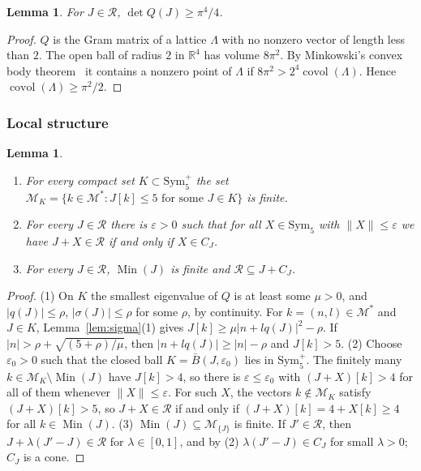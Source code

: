 \documentclass[11pt,reqno]{amsart}
\renewcommand{\_}{\origunderscore\allowbreak}
\numberwithin{equation}{section}
\theoremstyle{plain}
\newtheorem{lem}[thm]{Lemma}
\theoremstyle{definition}
\theoremstyle{remark}
\newcommand{\R}{\mathbb{R}}
\newcommand{\M}{\mathcal{M}}
\newcommand{\Rk}{\mathcal{R}}
\newcommand{\Sym}{\mathrm{Sym}}
\newcommand{\Min}{\operatorname{Min}}
\newcommand{\covol}{\operatorname{covol}}
\begin{document}
\begin{lem}\label{lem:minkowski}
For $J\in\Rk$, $\det Q(J)\ge\pi^4/4$.
\end{lem}

\begin{proof}
$Q$ is the Gram matrix of a lattice $\Lambda$ with no nonzero vector of length less than $2$. The open ball of radius $2$ in $\R^4$ has volume $8\pi^2$. By Minkowski's convex body theorem~\cite[Ch.~III]{Cassels1959} it contains a nonzero point of $\Lambda$ if $8\pi^2>2^4\covol(\Lambda)$. Hence $\covol(\Lambda)\ge\pi^2/2$.
\end{proof}

\subsubsection{Local structure}

\begin{lem}\label{lem:local}
\begin{enumerate}
\item For every compact set $K\subset\Sym_5^+$ the set $\M_K=\{k\in\M^*: J[k]\le5\text{ for some }J\in K\}$ is finite.
\item For every $J\in\Rk$ there is $\varepsilon>0$ such that for all $X\in\Sym_5$ with $\|X\|\le\varepsilon$ we have $J+X\in\Rk$ if and only if $X\in C_J$.
\item For every $J\in\Rk$, $\Min(J)$ is finite and $\Rk\subseteq J+C_J$.
\end{enumerate}
\end{lem}

\begin{proof}
(1) On $K$ the smallest eigenvalue of $Q$ is at least some $\mu>0$, and $|q(J)|\le\rho$, $|\sigma(J)|\le\rho$ for some $\rho$, by continuity. For $k=(n,l)\in\M^*$ and $J\in K$, Lemma~\ref{lem:sigma}(1) gives $J[k]\ge\mu|n+lq(J)|^2-\rho$. If $|n|>\rho+\sqrt{(5+\rho)/\mu}$, then $|n+lq(J)|\ge|n|-\rho$ and $J[k]>5$.
(2) Choose $\varepsilon_0>0$ such that the closed ball $K=\bar B(J,\varepsilon_0)$ lies in $\Sym_5^+$. The finitely many $k\in\M_K\setminus\Min(J)$ have $J[k]>4$, so there is $\varepsilon\le\varepsilon_0$ with $(J+X)[k]>4$ for all of them whenever $\|X\|\le\varepsilon$. For such $X$, the vectors $k\notin\M_K$ satisfy $(J+X)[k]>5$, so $J+X\in\Rk$ if and only if $(J+X)[k]=4+X[k]\ge4$ for all $k\in\Min(J)$.
(3) $\Min(J)\subseteq\M_{\{J\}}$ is finite. If $J'\in\Rk$, then $J+\lambda(J'-J)\in\Rk$ for $\lambda\in[0,1]$, and by (2) $\lambda(J'-J)\in C_J$ for small $\lambda>0$; $C_J$ is a cone.
\end{proof}
\end{document}
